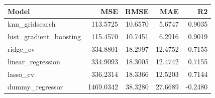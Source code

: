 \begin{tabular}{lrrrr}
\toprule
Model & MSE & RMSE & MAE & R2 \\
\midrule
knn\_gridsearch & 113.5725 & 10.6570 & 5.6747 & 0.9035 \\
hist\_gradient\_boosting & 115.4570 & 10.7451 & 6.2916 & 0.9019 \\
ridge\_cv & 334.8801 & 18.2997 & 12.4752 & 0.7155 \\
linear\_regression & 334.9093 & 18.3005 & 12.4742 & 0.7155 \\
lasso\_cv & 336.2314 & 18.3366 & 12.5203 & 0.7144 \\
dummy\_regressor & 1469.0342 & 38.3280 & 27.6689 & -0.2480 \\
\bottomrule
\end{tabular}
